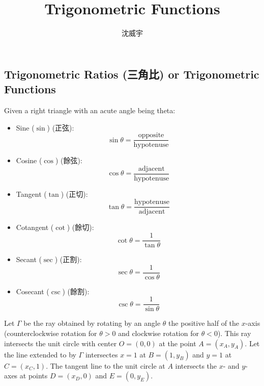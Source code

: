 \documentclass[a4paper,12pt]{report}
\begin{document}
\title{Trigonometric Functions}
\author{沈威宇}
\date{\temtoday}
\titletocdoc
\renewcommand{\arraystretch}{1.5}
\subsection{Trigonometric Ratios (三角比) or Trigonometric Functions}
Given a right triangle with an acute angle being theta:
\begin{itemize}
  \item Sine ($\sin$) (正弦):
      \[\sin \theta = \frac{\text{opposite}}{\text{hypotenuse}}\]
  \item Cosine ($\cos$) (餘弦):
      \[\cos \theta = \frac{\text{adjacent}}{\text{hypotenuse}}\]
  \item Tangent ($\tan$) (正切):
      \[\tan \theta = \frac{\text{hypotenuse}}{\text{adjacent}}\]
  \item Cotangent ($\cot$) (餘切):
      \[\cot \theta = \frac{1}{\tan \theta}\]
  \item Secant ($\sec$) (正割):
      \[\sec \theta = \frac{1}{\cos \theta}\]
  \item Cosecant ($\csc$) (餘割):
      \[\csc \theta = \frac{1}{\sin \theta}\]
\end{itemize}
Let $\Gamma$ be the ray obtained by rotating by an angle $\theta$ the positive half of the $x$-axis (counterclockwise rotation for $\theta>0$ and clockwise rotation for $\theta<0$). This ray intersects the unit circle with center $O=(0,0)$ at the point $A=(x_A,y_A)$. Let the line extended to by $\Gamma$ intersectes $x=1$ at $B=(1,y_B)$ and $y=1$ at $C=(x_C,1)$. The tangent line to the unit circle at $A$ intersects the $x$- and $y$-axes at points $D=(x_D,0)$ and $E=(0,y_E)$.
\end{document}
